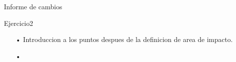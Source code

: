 \documentclass[10pt,a4paper]{article}
\begin{document}
\par{Informe de cambios}
\\
\par{Ejercicio2}
\begin{itemize}
\item[•] Introduccion a los puntos despues de la definicion de area de impacto.
\item[•] 
\end{itemize}
\end{document}
